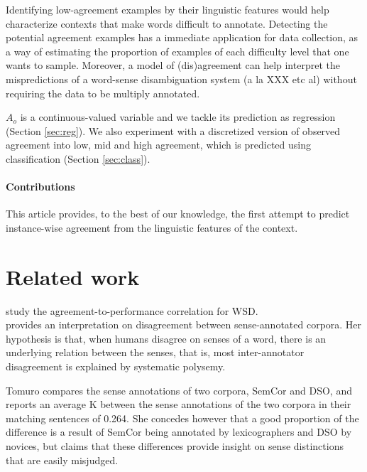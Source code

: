 \documentclass[11pt,a4paper]{article}
\begin{document}
Identifying low-agreement examples by their linguistic features would help characterize contexts that make words difficult to annotate. Detecting the potential agreement examples has a immediate application for data collection, as a way of estimating the proportion of examples of each difficulty level that one wants to sample. Moreover, a model of (dis)agreement can help interpret the mispredictions of a word-sense disambiguation system (a la XXX etc al) without requiring the data to be multiply annotated. 

$A_o$ is a continuous-valued variable and we tackle its prediction as regression (Section \ref{sec:reg}). We also experiment with a discretized version of observed agreement into low, mid and high agreement, which is predicted using classification (Section \ref{sec:class}).  

\paragraph{Contributions} This article provides, to the best of our knowledge, the first attempt to predict instance-wise agreement from the linguistic features of the context.
\section{Related work}


\cite{Plank2014} 

\cite{Jurgens2014}

\cite{Passonneau2014}

\cite{Jurgens2013}

\cite{Lopez2015} study the agreement-to-performance correlation for WSD. \\

\cite{Tomuro2001a} provides an interpretation on disagreement between sense-annotated corpora. Her hypothesis is that, when humans disagree on senses of a word, there is an underlying relation between the senses, that is, most inter-annotator disagreement is explained by systematic polysemy. 

Tomuro compares the sense annotations of two corpora, SemCor and DSO, and reports an average K between the sense annotations of the two corpora in their matching sentences of 0.264. She concedes however that a good proportion of the difference is a result of SemCor being annotated by lexicographers and DSO by novices, but claims that these differences provide insight on sense distinctions that are easily misjudged.
\end{document}
